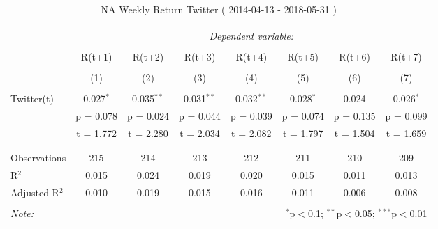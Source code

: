 \documentclass[
]{article}
\newenvironment{Shaded}{\begin{snugshade}}{\end{snugshade}}
\newcommand{\DataTypeTok}[1]{\textcolor[rgb]{0.13,0.29,0.53}{#1}}
\newcommand{\KeywordTok}[1]{\textcolor[rgb]{0.13,0.29,0.53}{\textbf{#1}}}
\newcommand{\NormalTok}[1]{#1}
\newcommand{\OperatorTok}[1]{\textcolor[rgb]{0.81,0.36,0.00}{\textbf{#1}}}
\newcommand{\StringTok}[1]{\textcolor[rgb]{0.31,0.60,0.02}{#1}}
\begin{document}
\begin{table}[!htbp] \centering 
  \caption{NA Weekly Return Twitter ( 2014-04-13 - 2018-05-31 )} 
  \label{} 
\begin{tabular}{@{\extracolsep{5pt}}lccccccc} 
\\[-1.8ex]\hline 
\hline \\[-1.8ex] 
 & \multicolumn{7}{c}{\textit{Dependent variable:}} \\ 
\cline{2-8} 
\\[-1.8ex] & R(t+1) & R(t+2) & R(t+3) & R(t+4) & R(t+5) & R(t+6) & R(t+7) \\ 
\\[-1.8ex] & (1) & (2) & (3) & (4) & (5) & (6) & (7)\\ 
\hline \\[-1.8ex] 
 Twitter(t) & 0.027$^{*}$ & 0.035$^{**}$ & 0.031$^{**}$ & 0.032$^{**}$ & 0.028$^{*}$ & 0.024 & 0.026$^{*}$ \\ 
  & p = 0.078 & p = 0.024 & p = 0.044 & p = 0.039 & p = 0.074 & p = 0.135 & p = 0.099 \\ 
  & t = 1.772 & t = 2.280 & t = 2.034 & t = 2.082 & t = 1.797 & t = 1.504 & t = 1.659 \\ 
  & & & & & & & \\ 
\hline \\[-1.8ex] 
Observations & 215 & 214 & 213 & 212 & 211 & 210 & 209 \\ 
R$^{2}$ & 0.015 & 0.024 & 0.019 & 0.020 & 0.015 & 0.011 & 0.013 \\ 
Adjusted R$^{2}$ & 0.010 & 0.019 & 0.015 & 0.016 & 0.011 & 0.006 & 0.008 \\ 
\hline 
\hline \\[-1.8ex] 
\textit{Note:}  & \multicolumn{7}{r}{$^{*}$p$<$0.1; $^{**}$p$<$0.05; $^{***}$p$<$0.01} \\ 
\end{tabular} 
\end{table}

\begin{Shaded}
\end{Shaded}
\end{document}
